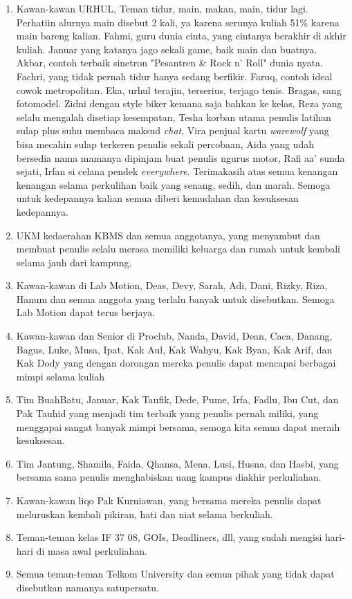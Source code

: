 \begin{enumerate}
      \item Kawan-kawan URHUL, Teman tidur, main, makan, main, tidur lagi. Perhatiin alurnya main disebut 2 kali, ya karena serunya kuliah 51\% karena main bareng kalian. Fahmi, guru dunia cinta, yang cintanya berakhir di akhir kuliah. Januar yang katanya jago sekali game, baik main dan buatnya. Akbar, contoh terbaik sinetron "Pesantren \& Rock n' Roll" dunia nyata. Fachri, yang tidak pernah tidur hanya sedang berfikir. Faruq, contoh ideal cowok metropolitan. Eka, urhul terajin, terserius, terjago tenis. Bragas, sang fotomodel. Zidni dengan style biker kemana saja bahkan ke kelas, Reza yang selalu mengalah disetiap kesempatan, Tesha korban utama penulis latihan sulap plus suhu membaca maksud \textit{chat}, Vira penjual kartu \textit{warewolf} yang bisa mecahin sulap terkeren penulis sekali percobaan, Aida yang udah bersedia nama mamanya dipinjam buat penulis ngurus motor, Rafi aa' sunda sejati, Irfan si celana pendek \textit{everywhere}. Terimakasih atas semua kenangan kenangan selama perkulihan baik yang senang, sedih, dan marah. Semoga untuk kedepannya kalian semua diberi kemudahan dan kesuksesan kedepannya.
      \item UKM kedaerahan KBMS dan semua anggotanya, yang menyambut dan membuat penulis selalu merasa memiliki keluarga dan rumah untuk kembali selama jauh dari kampung.
      \item Kawan-kawan di Lab Motion, Deas, Devy, Sarah, Adi, Dani, Rizky, Riza, Hanum dan semua anggota yang terlalu banyak untuk disebutkan. Semoga Lab Motion dapat terus berjaya.
      \item Kawan-kawan dan Senior di Proclub, Nanda, David, Dean, Caca, Danang, Bagus, Luke, Musa, Ipat, Kak Aul, Kak Wahyu, Kak Byan, Kak Arif, dan Kak Dody yang dengan dorongan mereka penulis dapat mencapai berbagai mimpi selama kuliah
      \item Tim BuahBatu, Januar, Kak Taufik, Dede, Pume, Irfa, Fadlu, Ibu Cut, dan Pak Tauhid yang menjadi tim terbaik yang penulis pernah miliki, yang menggapai sangat banyak mimpi bersama, semoga kita semua dapat meraih kesuksesan.
      \item Tim Jantung, Shamila, Faida, Qhansa, Mena, Lusi, Husna, dan Hasbi, yang bersama sama penulis menghabiskan uang kampus diakhir perkuliahan.
      \item Kawan-kawan liqo Pak Kurniawan, yang bersama mereka penulis dapat meluruskan kembali pikiran, hati dan niat selama berkuliah.
      \item Teman-teman kelas IF 37 08, GOIs, Deadliners, dll, yang sudah mengisi hari-hari di masa awal perkuliahan.
      \item Semua teman-teman Telkom University dan semua pihak yang tidak dapat disebutkan namanya satupersatu.
  \end{enumerate}